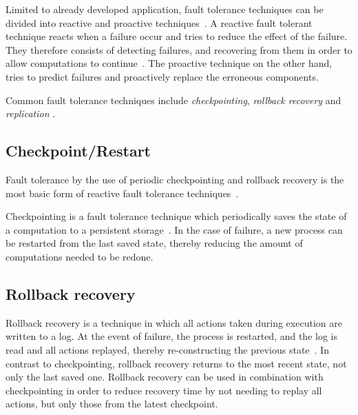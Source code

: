 \documentclass{cslthse-msc}
\begin{document}
Limited to already developed application, fault tolerance techniques can be divided into reactive and proactive techniques~\cite{faultToleranceChallenges}. A reactive fault tolerant technique reacts when a failure occur and tries to reduce the effect of the failure. They therefore consists of detecting failures, and recovering from them in order to allow computations to continue~\cite{relGridSystems}. The proactive technique on the other hand, tries to predict failures and proactively replace the erroneous components.

Common fault tolerance techniques include \emph{checkpointing}, \emph{rollback recovery} and \emph{replication} \cite{relGridSystems}.

\subsection{Checkpoint/Restart} \label{subsec:background_checkpoint}
Fault tolerance by the use of periodic checkpointing and rollback recovery is the most basic form of reactive fault tolerance techniques~\cite{surveyFaultParallel}.

Checkpointing is a fault tolerance technique which periodically saves the state of a computation to a persistent storage~\cite{relGridSystems, surveyFaultParallel}. In the case of failure, a new process can be restarted from the last saved state, thereby reducing the amount of computations needed to be redone.


\subsection{Rollback recovery} \label{subsec:background_rollback}
Rollback recovery is a technique in which all actions taken during execution are written to a log. At the event of failure, the process is restarted, and the log is read and all actions replayed, thereby re-constructing the previous state~\cite{surveyFaultParallel}. In contrast to checkpointing, rollback recovery returns to the most recent state, not only the last saved one. Rollback recovery can be used in combination with checkpointing in order to reduce recovery time by not needing to replay all actions, but only those from the latest checkpoint.
\end{document}
